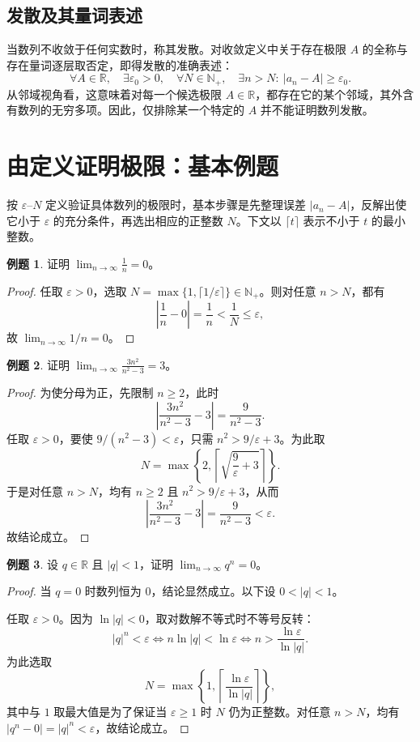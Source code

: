 \documentclass[UTF8, fontset=fandol, a4paper, 12pt]{ctexart}
\newcommand{\R}{\mathbb R}
\newcommand{\Nplus}{\mathbb N_{+}}
\theoremstyle{definition}
\newtheorem{example}{例题}
\begin{document}
\subsection{发散及其量词表述}
当数列不收敛于任何实数时，称其发散。对收敛定义中关于存在极限 $A$ 的全称与存在量词逐层取否定，即得发散的准确表述：
\[
 \forall A\in\R,\quad\exists\varepsilon_0>0,\quad
 \forall N\in\Nplus,\quad\exists n>N:\ |a_n-A|\ge\varepsilon_0.
\]
从邻域视角看，这意味着对每一个候选极限 $A\in\R$，都存在它的某个邻域，其外含有数列的无穷多项。因此，仅排除某一个特定的 $A$ 并不能证明数列发散。

\section{由定义证明极限：基本例题}
按 $\varepsilon$--$N$ 定义验证具体数列的极限时，基本步骤是先整理误差 $|a_n-A|$，反解出使它小于 $\varepsilon$ 的充分条件，再选出相应的正整数 $N$。下文以 $\lceil t\rceil$ 表示不小于 $t$ 的最小整数。

\begin{example}
证明 $\displaystyle\lim_{n\to\infty}\frac1n=0$。
\end{example}
\begin{proof}
任取 $\varepsilon>0$，选取 $N=\max\{1,\lceil1/\varepsilon\rceil\}\in\Nplus$。则对任意 $n>N$，都有
\[
 \left|\frac1n-0\right|=\frac1n<\frac1N\le\varepsilon,
\]
故 $\lim_{n\to\infty}1/n=0$。
\end{proof}

\begin{example}
证明 $\displaystyle\lim_{n\to\infty}\frac{3n^2}{n^2-3}=3$。
\end{example}
\begin{proof}
为使分母为正，先限制 $n\ge2$，此时
\[
 \left|\frac{3n^2}{n^2-3}-3\right|=\frac9{n^2-3}.
\]
任取 $\varepsilon>0$，要使 $9/(n^2-3)<\varepsilon$，只需 $n^2>9/\varepsilon+3$。为此取
\[
 N=\max\left\{2,\left\lceil\sqrt{\frac9\varepsilon+3}\right\rceil\right\}.
\]
于是对任意 $n>N$，均有 $n\ge2$ 且 $n^2>9/\varepsilon+3$，从而
\[
 \left|\frac{3n^2}{n^2-3}-3\right|=\frac9{n^2-3}<\varepsilon.
\]
故结论成立。
\end{proof}

\begin{example}
设 $q\in\R$ 且 $|q|<1$，证明 $\displaystyle\lim_{n\to\infty}q^n=0$。
\end{example}
\begin{proof}
当 $q=0$ 时数列恒为 $0$，结论显然成立。以下设 $0<|q|<1$。

任取 $\varepsilon>0$。因为 $\ln|q|<0$，取对数解不等式时不等号反转：
\[
 |q|^n<\varepsilon
 \iff n\ln|q|<\ln\varepsilon
 \iff n>\frac{\ln\varepsilon}{\ln|q|}.
\]
为此选取
\[
 N=\max\left\{1,\left\lceil\frac{\ln\varepsilon}{\ln|q|}\right\rceil\right\},
\]
其中与 $1$ 取最大值是为了保证当 $\varepsilon\ge1$ 时 $N$ 仍为正整数。对任意 $n>N$，均有 $|q^n-0|=|q|^n<\varepsilon$，故结论成立。
\end{proof}
\end{document}
